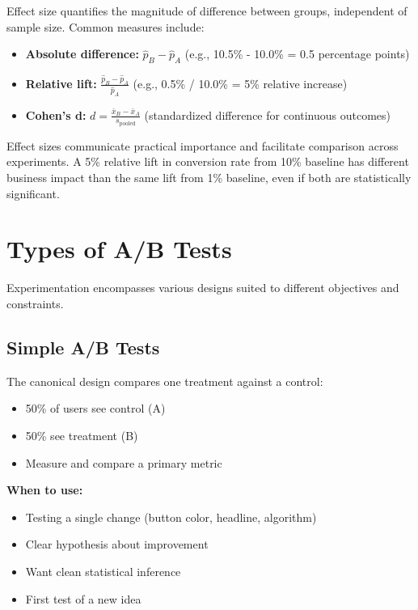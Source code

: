 \begin{definition}
Effect size quantifies the magnitude of difference between groups, independent of sample size. Common measures include:
\begin{itemize}
    \item \textbf{Absolute difference:} $\hat{p}_B - \hat{p}_A$ (e.g., 10.5\% - 10.0\% = 0.5 percentage points)
    \item \textbf{Relative lift:} $\frac{\hat{p}_B - \hat{p}_A}{\hat{p}_A}$ (e.g., 0.5\% / 10.0\% = 5\% relative increase)
    \item \textbf{Cohen's d:} $d = \frac{\bar{x}_B - \bar{x}_A}{s_{\text{pooled}}}$ (standardized difference for continuous outcomes)
\end{itemize}
\end{definition}

Effect sizes communicate practical importance and facilitate comparison across experiments. A 5\% relative lift in conversion rate from 10\% baseline has different business impact than the same lift from 1\% baseline, even if both are statistically significant.

\section{Types of A/B Tests}

Experimentation encompasses various designs suited to different objectives and constraints.

\subsection{Simple A/B Tests}

The canonical design compares one treatment against a control:
\begin{itemize}
    \item 50\% of users see control (A)
    \item 50\% see treatment (B)
    \item Measure and compare a primary metric
\end{itemize}

\textbf{When to use:}
\begin{itemize}
    \item Testing a single change (button color, headline, algorithm)
    \item Clear hypothesis about improvement
    \item Want clean statistical inference
    \item First test of a new idea
\end{itemize}

